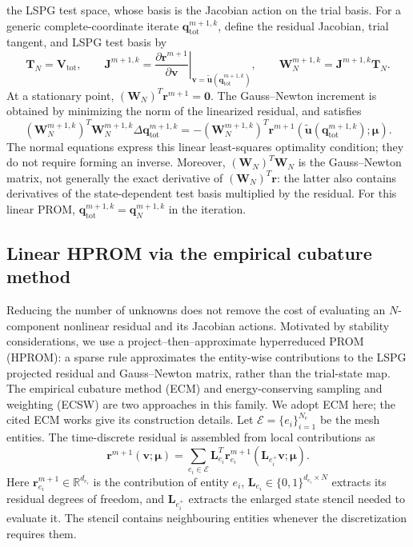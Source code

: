 \documentclass[11pt]{article}
\newcommand{\q}{\mathbf q}
\newcommand{\qtot}{\mathbf q_{\mathrm{tot}}}
\newcommand{\utilde}{\widetilde{\mathbf u}}
\newcommand{\mub}{\bm\mu}
\begin{document}
the LSPG test space, whose basis is the Jacobian action on the trial basis.
For a generic complete-coordinate iterate $\qtot^{m+1,k}$, define the
residual Jacobian, trial tangent, and LSPG test basis by
\begin{equation}
\mathbf T_N=\mathbf V_{\mathrm{tot}},\qquad
\mathbf J^{m+1,k}=
\left.\frac{\partial\mathbf r^{m+1}}{\partial\mathbf v}\right|_{
\mathbf v=\utilde(\qtot^{m+1,k})},\qquad
\mathbf W_N^{m+1,k}=\mathbf J^{m+1,k}\mathbf T_N.
\end{equation}
At a stationary point,
$(\mathbf W_N)^T\mathbf r^{m+1}=\mathbf0$.
The Gauss--Newton increment is obtained by minimizing the norm of the
linearized residual, and satisfies
\begin{equation}
\left(\mathbf W_N^{m+1,k}\right)^T\mathbf W_N^{m+1,k}
\Delta\qtot^{m+1,k}=-
\left(\mathbf W_N^{m+1,k}\right)^T
\mathbf r^{m+1}\!\left(\utilde(\qtot^{m+1,k});\mub\right).
\label{eq:linear-prom-gn}
\end{equation}
The normal equations express this linear least-squares optimality
condition; they do not require forming an inverse.  Moreover,
$(\mathbf W_N)^T\mathbf W_N$ is the Gauss--Newton matrix, not generally the
exact derivative of $(\mathbf W_N)^T\mathbf r$: the latter also contains
derivatives of the state-dependent test basis multiplied by the residual.
For this linear PROM, $\qtot^{m+1,k}=\q_N^{m+1,k}$ in the iteration.

\subsection{Linear HPROM via the empirical cubature method}
\label{sec:linear-hprom}
Reducing the number of unknowns does not remove the cost of evaluating
an $N$-component nonlinear residual and its Jacobian actions.
Motivated by stability considerations, we use a project--then--approximate
hyperreduced PROM (HPROM): a sparse rule approximates the entity-wise
contributions to the LSPG projected residual and Gauss--Newton matrix,
rather than the trial-state map.  The empirical cubature method (ECM)
\cite{hernandez2017dimensional,hernandez2020multiscale} and
energy-conserving sampling and weighting (ECSW) \cite{farhat2015structure}
are two approaches in this family.  We adopt ECM here; the cited ECM works
give its construction details.  Let
$\mathcal E=\{e_i\}_{i=1}^{N_e}$ be the mesh entities.  The time-discrete
residual is assembled from local contributions as
\begin{equation}
\mathbf r^{m+1}(\mathbf v;\mub)=\sum_{e_i\in\mathcal E}\mathbf L_{e_i}^T
\mathbf r_{e_i}^{m+1}(\mathbf L_{e_i^+}\mathbf v;\mub).
\label{eq:entity-residual}
\end{equation}
Here $\mathbf r_{e_i}^{m+1}\in\mathbb R^{d_{e_i}}$ is the contribution of
entity $e_i$, $\mathbf L_{e_i}\in\{0,1\}^{d_{e_i}\times N}$ extracts its
residual degrees of freedom, and $\mathbf L_{e_i^+}$ extracts the enlarged
state stencil needed to evaluate it.  The stencil contains neighbouring
entities whenever the discretization requires them.
\end{document}
